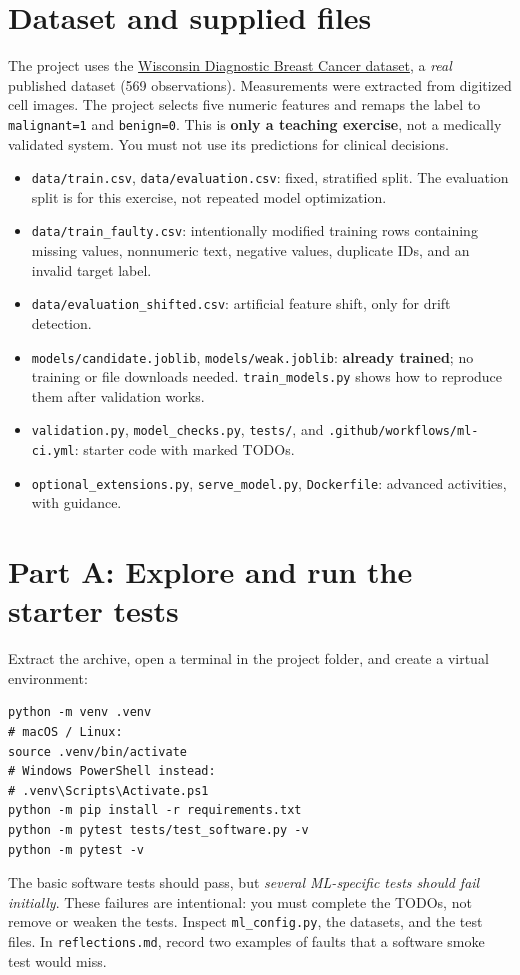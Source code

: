 \documentclass[11pt,a4paper]{article}
\begin{document}
\section{Dataset and supplied files}
The project uses the \href{https://scikit-learn.org/stable/modules/generated/sklearn.datasets.load_breast_cancer.html}{Wisconsin Diagnostic Breast Cancer dataset}, a \emph{real} published dataset (569 observations). Measurements were extracted from digitized cell images. The project selects five numeric features and remaps the label to \texttt{malignant=1} and \texttt{benign=0}. This is \textbf{only a teaching exercise}, not a medically validated system. You must not use its predictions for clinical decisions.
\begin{itemize}
\item \texttt{data/train.csv}, \texttt{data/evaluation.csv}: fixed, stratified split. The evaluation split is for this exercise, not repeated model optimization.
\item \texttt{data/train\_faulty.csv}: intentionally modified training rows containing missing values, nonnumeric text, negative values, duplicate IDs, and an invalid target label.
\item \texttt{data/evaluation\_shifted.csv}: artificial feature shift, only for drift detection.
\item \texttt{models/candidate.joblib}, \texttt{models/weak.joblib}: \textbf{already trained}; no training or file downloads needed. \texttt{train\_models.py} shows how to reproduce them after validation works.
\item \texttt{validation.py}, \texttt{model\_checks.py}, \texttt{tests/}, and \texttt{.github/workflows/ml-ci.yml}: starter code with marked TODOs.
\item \texttt{optional\_extensions.py}, \texttt{serve\_model.py}, \texttt{Dockerfile}: advanced activities, with guidance.
\end{itemize}
\section{Part A: Explore and run the starter tests}
Extract the archive, open a terminal in the project folder, and create a virtual environment:
\begin{lstlisting}
python -m venv .venv
# macOS / Linux:
source .venv/bin/activate
# Windows PowerShell instead:
# .venv\Scripts\Activate.ps1
python -m pip install -r requirements.txt
python -m pytest tests/test_software.py -v
python -m pytest -v
\end{lstlisting}
The basic software tests should pass, but \emph{several ML-specific tests should fail initially}. These failures are intentional: you must complete the TODOs, not remove or weaken the tests. Inspect \texttt{ml\_config.py}, the datasets, and the test files. In \texttt{reflections.md}, record two examples of faults that a software smoke test would miss.
\end{document}
